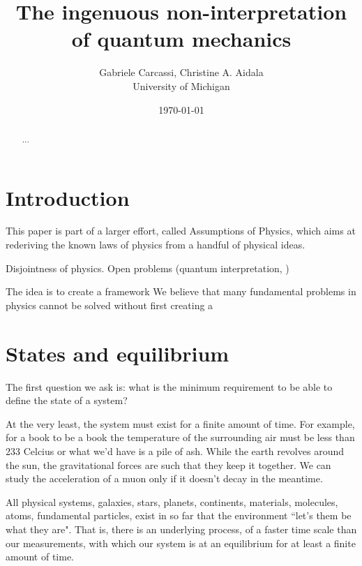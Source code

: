 \documentclass[letterpaper]{article}
\theoremstyle{plain}%
\theoremstyle{definition}
\theoremstyle{remark}
\begin{document}
\title{The ingenuous non-interpretation of quantum mechanics}
\author{Gabriele Carcassi, Christine A. Aidala \\ University of Michigan}

\date{\today}

\maketitle

\begin{abstract}
	...
\end{abstract}



\section{Introduction}

This paper is part of a larger effort, called Assumptions of Physics, which aims at rederiving the known laws of physics from a handful of physical ideas. 

Disjointness of physics. Open problems (quantum interpretation, )

The idea is to create a framework We believe that many fundamental problems in physics cannot be solved without first creating a 


\section{States and equilibrium}

The first question we ask is: what is the minimum requirement to be able to define the state of a system?

At the very least, the system must exist for a finite amount of time. For example, for a book to be a book the temperature of the surrounding air must be less than 233 Celcius or what we'd have is a pile of ash. While the earth revolves around the sun, the gravitational forces are such that they keep it together. We can study the acceleration of a muon only if it doesn't decay in the meantime.

All physical systems, galaxies, stars, planets, continents, materials, molecules, atoms, fundamental particles, exist in so far that the environment ``let's them be what they are". That is, there is an underlying process, of a faster time scale than our measurements, with which our system is at an equilibrium for at least a finite amount of time.
\end{document}
